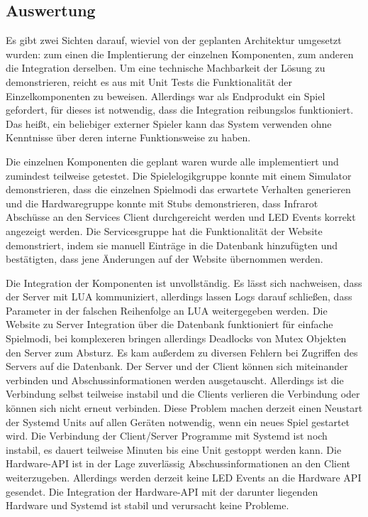 \subsection{Auswertung}

Es gibt zwei Sichten darauf, wieviel von der geplanten Architektur umgesetzt wurden: zum einen die
Implentierung der einzelnen Komponenten, zum anderen die Integration derselben.
Um eine technische Machbarkeit der Lösung zu demonstrieren, reicht es aus mit Unit Tests die
Funktionalität der Einzelkomponenten zu beweisen.
Allerdings war als Endprodukt ein Spiel gefordert, für dieses ist notwendig, dass die Integration
reibungslos funktioniert.
Das heißt, ein beliebiger externer Spieler kann das System verwenden ohne Kenntnisse über deren
interne Funktionsweise zu haben.

Die einzelnen Komponenten die geplant waren wurde alle implementiert und zumindest teilweise
getestet.
Die Spielelogikgruppe konnte mit einem Simulator demonstrieren, dass die einzelnen Spielmodi das
erwartete Verhalten generieren und die Hardwaregruppe konnte mit Stubs demonstrieren, dass Infrarot
Abschüsse an den Services Client durchgereicht werden und LED Events korrekt angezeigt werden.
Die Servicesgruppe hat die Funktionalität der Website demonstriert, indem sie manuell Einträge in
die Datenbank hinzufügten und bestätigten, dass jene Änderungen auf der Website übernommen werden.

Die Integration der Komponenten ist unvollständig.
Es lässt sich nachweisen, dass der Server mit LUA kommuniziert, allerdings lassen Logs darauf
schließen, dass Parameter in der falschen Reihenfolge an LUA weitergegeben werden.
Die Website zu Server Integration über die Datenbank funktioniert für einfache Spielmodi, bei
komplexeren bringen allerdings Deadlocks von Mutex Objekten den Server zum Absturz.
Es kam außerdem zu diversen Fehlern bei Zugriffen des Servers auf die Datenbank.
Der Server und der Client können sich miteinander verbinden und Abschussinformationen werden
ausgetauscht.
Allerdings ist die Verbindung selbst teilweise instabil und die Clients verlieren die Verbindung
oder können sich nicht erneut verbinden.
Diese Problem machen derzeit einen Neustart der Systemd Units auf allen Geräten notwendig, wenn ein
neues Spiel gestartet wird.
Die Verbindung der Client/Server Programme mit Systemd ist noch instabil, es dauert teilweise
Minuten bis eine Unit gestoppt werden kann.
Die Hardware-API ist in der Lage zuverlässig Abschussinformationen an den Client weiterzugeben.
Allerdings werden derzeit keine LED Events an die Hardware API gesendet.
Die Integration der Hardware-API mit der darunter liegenden Hardware und Systemd ist stabil und
verursacht keine Probleme.
